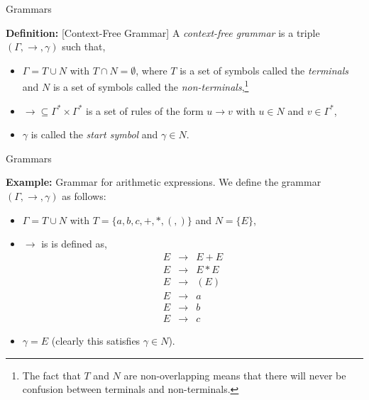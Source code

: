 \documentclass{beamer}
\begin{document}
\begin{frame}[fragile]{Grammars}

\small

{\bf Definition:} [Context-Free Grammar] A {\em context-free grammar} is a triple $(\Gamma,\rightarrow,\gamma)$ such that,
\begin{itemize}
\item
$\Gamma = T \cup N$ with $T\cap N = \emptyset$, where $T$ is a set of symbols called the {\em terminals} and $N$ is a set of symbols
called the {\em non-terminals},\footnote{The fact that $T$ and $N$ are non-overlapping means
that there will never be confusion between terminals and non-terminals.}
\item
$\rightarrow\subseteq \Gamma^*\times\Gamma^*$ is a set of rules of
the form $u \rightarrow v$ with $u\in N$ and $v\in\Gamma^*$,
\item
$\gamma$ is called the {\em start symbol} and $\gamma\in N$.
\end{itemize}
\end{frame}

\begin{frame}[fragile]{Grammars}

\small
{\bf Example:} Grammar for arithmetic expressions.  We define the grammar $(\Gamma, \rightarrow, \gamma)$ as follows:
\begin{itemize}
\item $\Gamma = T \cup N$ with $T = \{ a, b, c, +, *, (, )\}$ and $N=\{ E \}$,
\item $\rightarrow$ is is defined as,
{\scriptsize
\[
\begin{array}{rcl}
E & \rightarrow & E + E \\
E & \rightarrow & E * E \\
E & \rightarrow & ( E )\\
E & \rightarrow & a\\
E & \rightarrow & b\\
E & \rightarrow & c
\end{array}
\]
}
\item $\gamma = E$ (clearly this satisfies $\gamma\in N$).
\end{itemize}
\end{frame}
\end{document}
